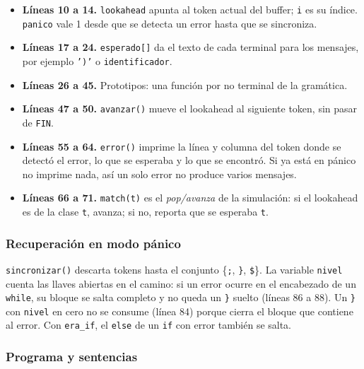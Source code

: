 \documentclass[12pt]{article}
\newcommand{\cmd}[1]{\texttt{\small #1}}
\begin{document}
\begin{itemize}[leftmargin=1.1cm,itemsep=0.25em]
\item \textbf{Líneas 10 a 14.} \cmd{lookahead} apunta al token actual del buffer; \cmd{i} es su
índice. \cmd{panico} vale 1 desde que se detecta un error hasta que se sincroniza.
\item \textbf{Líneas 17 a 24.} \cmd{esperado[]} da el texto de cada terminal para los mensajes,
por ejemplo \cmd{')'} o \cmd{identificador}.
\item \textbf{Líneas 26 a 45.} Prototipos: una función por no terminal de la gramática.
\item \textbf{Líneas 47 a 50.} \cmd{avanzar()} mueve el lookahead al siguiente token, sin pasar
de \cmd{FIN}.
\item \textbf{Líneas 55 a 64.} \cmd{error()} imprime la línea y columna del token donde se
detectó el error, lo que se esperaba y lo que se encontró. Si ya está en pánico no imprime nada,
así un solo error no produce varios mensajes.
\item \textbf{Líneas 66 a 71.} \cmd{match(t)} es el \emph{pop/avanza} de la simulación: si el
lookahead es de la clase \cmd{t}, avanza; si no, reporta que se esperaba \cmd{t}.
\end{itemize}

\subsubsection*{Recuperación en modo pánico}



\cmd{sincronizar()} descarta tokens hasta el conjunto \{\cmd{;}, \cmd{\}}, \cmd{\$}\}. La
variable \cmd{nivel} cuenta las llaves abiertas en el camino: si un error ocurre en el encabezado
de un \cmd{while}, su bloque se salta completo y no queda un \cmd{\}} suelto (líneas 86 a 88). Un
\cmd{\}} con \cmd{nivel} en cero no se consume (línea 84) porque cierra el bloque que contiene al
error. Con \cmd{era\_if}, el \cmd{else} de un \cmd{if} con error también se salta.

\subsubsection*{Programa y sentencias}
\end{document}
